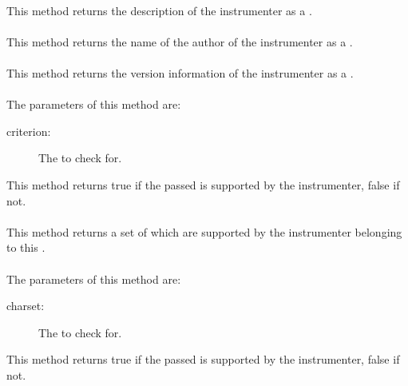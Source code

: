 \paragraph{} \label{Classes:Instrumentation:InstrumenterDescriptor:getDescription}
This method returns the description of the instrumenter as a .
\paragraph{} \label{Classes:Instrumentation:InstrumenterDescriptor:getAuthor}
This method returns the name of the author of the instrumenter as a .
\paragraph{} \label{Classes:Instrumentation:InstrumenterDescriptor:getVersion}
This method returns the version information of the instrumenter as a .
\paragraph{} \label{Classes:Instrumentation:InstrumenterDescriptor:isCriterionSupported}
The parameters of this method are:
\begin{description}
\item[criterion:] The  to check for.

\end{description}
This method returns true if the passed  is supported by the instrumenter, false if not.
\paragraph{} \label{Classes:Instrumentation:InstrumenterDescriptor:getSupportedCriteria}
This method returns a set of  which are supported by the instrumenter belonging to this .
\paragraph{} \label{Classes:Instrumentation:InstrumenterDescriptor:isCharsetSupported}
The parameters of this method are:
\begin{description}
\item[charset:] The  to check for.

\end{description}
This method returns true if the passed  is supported by the instrumenter, false if not.
